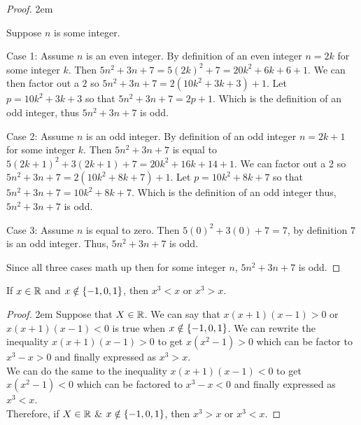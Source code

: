 \begin{mdframed}[backgroundcolor=gray!10!]
\begin{mdframed}[backgroundcolor=white]
\begin{proof} \openup 2em{Suppose $n$ is some integer.
\begin{description}
\item {Case 1:} Assume $n$ is an even integer.  By definition of an even integer $n=2k$ for some integer $k$.  Then $5n^2+3n+7=5(2k)^2+7=20k^2+6k+6+1.$  We can then factor out a $2$ so $5n^2+3n+7=2(10k^2+3k+3)+1$.  Let $p = 10k^2+3k+3$ so that $5n^2+3n+7=2p+1$.  Which is the definition of an odd integer, thus $5n^2+3n+7$ is odd.
\item{Case 2:} Assume $n$ is an odd integer.  By definition of an odd integer $n=2k+1$ for some integer $k$.  Then $5n^2+3n+7$ is equal to $5(2k+1)^2+3(2k+1)+7=20k^2+16k+14+1$.  We can factor out a 2 so $5n^2+3n+7=2(10k^2+8k+7)+1$.  Let $p=10k^2+8k+7$ so that $5n^2+3n+7=10k^2+8k+7$.  Which is the definition of an odd integer thus, $5n^2+3n+7$ is odd.
\item{Case 3:} Assume $n$ is equal to zero.  Then $5(0)^2+3(0)+7=7$, by definition $7$ is an odd integer.  Thus, $5n^2+3n+7$ is odd.  
\end{description}
Since all three cases math up then for some integer $n$, $5n^2+3n+7$ is odd.}
\end{proof}
\end{mdframed}
\end{mdframed}

\medskip

\begin{claim}
If $x \in \mathbb{R}$ and $x \notin \left\{-1,0,1\right\}$, then $x^3<x$ or $x^3>x$.
\end{claim}

\begin{mdframed}[backgroundcolor=gray!10!]

\begin{mdframed}[backgroundcolor=white]
\begin{proof} \openup 2em  Suppose that $X \in \mathbb{R}$.  We can say that $x(x+1)(x-1)>0$ or $x(x+1)(x-1)<0$ is true when $x \notin \left\{-1,0,1\right\}$.  We can rewrite the inequality $x(x+1)(x-1)>0$ to get $x(x^2-1)>0$ which can be factor to $x^3-x>0$ and finally expressed as $x^3>x$.\\
  We can do the same to the inequality $x(x+1)(x-1)<0$ to get $x(x^2-1)<0$ which can be factored to $x^3-x<0$ and finally expressed as $x^3<x$.\\
  Therefore, if $X \in \mathbb{R}$ \& $x \notin \left\{-1,0,1\right\}$, then $x^3>x$ or $x^3<x$.
\end{proof}
\end{mdframed}
\end{mdframed}

